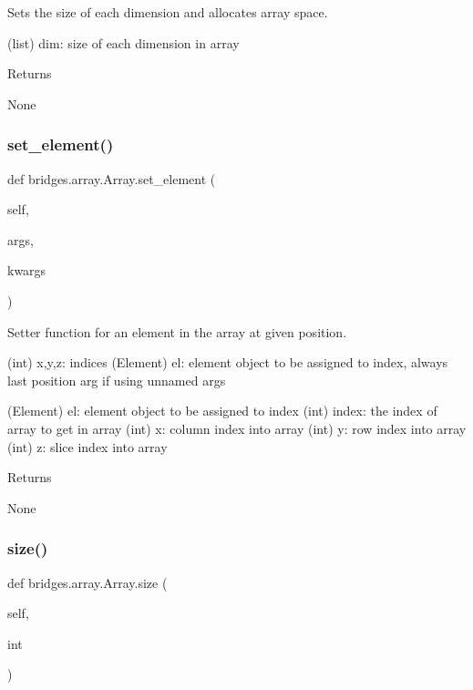 Sets the size of each dimension and allocates array space. 

(list) dim\+: size of each dimension in array \begin{DoxyReturn}{Returns}


None 
\end{DoxyReturn}
\mbox{\label{classbridges_1_1array_1_1_array_a371bbcb9aa75562a2c3f04ef1bb33faf}} 
\subsubsection{\texorpdfstring{set\+\_\+element()}{set\_element()}}
{\footnotesize\ttfamily def bridges.\+array.\+Array.\+set\+\_\+element (\begin{DoxyParamCaption}\item[{}]{self,  }\item[{}]{args,  }\item[{}]{kwargs }\end{DoxyParamCaption})}



Setter function for an element in the array at given position. 

(int) x,y,z\+: indices (Element) el\+: element object to be assigned to index, always last position arg if using unnamed args

(Element) el\+: element object to be assigned to index (int) index\+: the index of array to get in array (int) x\+: column index into array (int) y\+: row index into array (int) z\+: slice index into array \begin{DoxyReturn}{Returns}


None 
\end{DoxyReturn}
\mbox{\label{classbridges_1_1array_1_1_array_a01292e2099a89d0927855c25aedc8662}} 
\subsubsection{\texorpdfstring{size()}{size()}\hspace{0.1cm}{\footnotesize\ttfamily [1/2]}}
{\footnotesize\ttfamily def bridges.\+array.\+Array.\+size (\begin{DoxyParamCaption}\item[{}]{self,  }\item[{}]{int }\end{DoxyParamCaption})}



